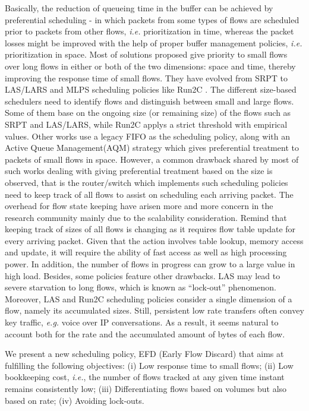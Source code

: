 \documentclass[preprint,12pt]{elsarticle}
\begin{document}
Basically, the reduction of queueing time in the buffer can be achieved by preferential scheduling - in which packets from some types of flows are scheduled prior to packets from other flows, \textit{i.e.} prioritization in time, whereas the packet losses might be improved with the help of proper buffer management policies, \textit{i.e.} prioritization in space. Most of solutions proposed give priority to small flows over long flows in either or both of the two dimensions: space and time, thereby improving the response time of small flows. They have evolved from SRPT \cite{kleinrock_76_queueing} to LAS/LARS \cite{Rai02size-basedscheduling,Martin10Lars} and MLPS scheduling policies like Run2C \cite{Avrachenkov04Run2c}. The different size-based schedulers need to identify flows and distinguish between small and large flows. Some of them base on the ongoing size (or remaining size) of the flows such as SRPT and LAS/LARS, while Run2C applys a strict threshold with empirical values. Other works use a legacy FIFO as the scheduling policy, along with an Active Queue Management(AQM) strategy which gives preferential treatment to packets of small flows in space. However, a common drawback shared by most of such works dealing with giving preferential treatment based on the size is observed, that is the router/switch which implements such scheduling policies need to keep track of all flows to assist on scheduling each arriving packet. The overhead for flow state keeping have arisen more and more concern in the research community \cite{chen2011efd, DivakaranAP11,Divakaran2012networks} mainly due to the scalability consideration. Remind that keeping track of sizes of all flows is changing as it requires flow table update for every arriving packet. Given that the action involves table lookup, memory access and update, it will require the ability of fast access as well as high processing power. In addition, the number of flows in progress can grow to a large value in high load. Besides, some policies feature other drawbacks. LAS may lead to severe starvation to long flows, which is known as ``lock-out'' phenomenon. Moreover, LAS and Run2C scheduling policies consider a single dimension of a flow, namely its accumulated sizes. Still, persistent low rate transfers often convey key traffic, \textit{e.g.} voice over IP conversations. As a result, it seems natural to account both for the rate and the accumulated amount of bytes of each flow. 

We present a new scheduling policy, EFD (Early Flow Discard) that aims at fulfilling the following objectives: (i) Low response time to small flows; (ii) Low bookkeeping cost, \textit{i.e.}, the number of flows tracked at any given time instant remains consistently low; (iii) Differentiating flows based on volumes but also based on rate; (iv) Avoiding lock-outs.
\end{document}
